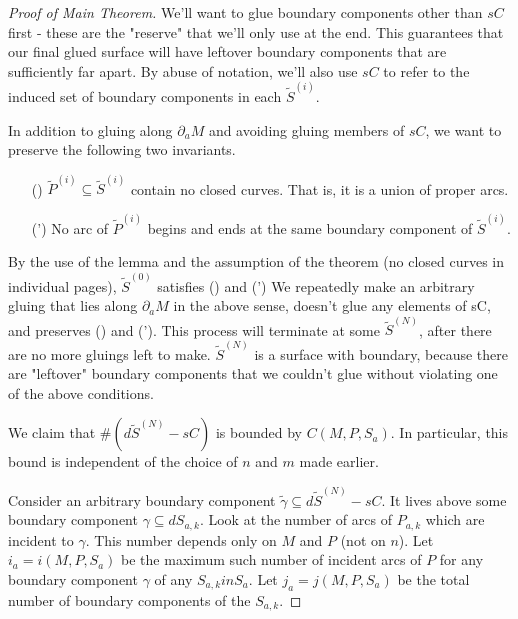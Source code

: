 \documentclass[12pt]{amsart}
\theoremstyle{definition}
\theoremstyle{remark}
\newcommand{\bd}{\partial}
\newcommand{\cin}{\subseteq}
\begin{document}
\begin{proof}[Proof of Main Theorem]
We'll want to glue boundary components other than $sC$ first - these are the
"reserve" that we'll only use at the end. This guarantees that our final glued
surface will have leftover boundary components that are sufficiently far apart.
By abuse of notation, we'll also use $sC$ to refer to the induced set of
boundary components in each $\widetilde{S}^{(i)}$.

In addition to gluing along $\bd_aM$ and avoiding gluing members of $sC$, we want
to preserve the following two invariants.


\begin{enumerate}

\item[(\dag)] $\widetilde{P}^{(i)} \cin \widetilde{S}^{(i)}$ contain no closed
curves.  That is, it is a union of proper arcs. \label{I:dag}

\item[(\dag')] No arc of $\widetilde{P}^{(i)}$ begins and ends at the same
boundary component of $\widetilde{S}^{(i)}$. \label{I:dag'}

\end{enumerate}

By the use of the lemma and the assumption of the theorem (no closed curves in
individual pages), $\widetilde{S}^{(0)}$ satisfies (\dag) and (\dag') We
repeatedly make an arbitrary gluing that lies along $\bd_aM$ in the above
sense, doesn't glue any elements of sC, and preserves (\dag) and (\dag').  This
process will terminate at some $\widetilde{S}^{(N)}$, after there are no more
gluings left to make. $\widetilde{S}^{(N)}$ is a surface with boundary, because
there are "leftover" boundary components that we couldn't glue without
violating one of the above conditions.


We claim that $\#(d\widetilde{S}^{(N)} - sC)$ is bounded by $C(M,P,S_a)$.  In
particular, this bound is independent of the choice of $n$ and $m$ made
earlier.


Consider an arbitrary boundary component $\widetilde{\gamma} \cin
d\widetilde{S}^{(N)} - sC$.  It lives above some boundary component $\gamma
\cin dS_{a,k}$. Look at the number of arcs of $P_{a,k}$ which are incident to
$\gamma$. This number depends only on $M$ and $P$ (not on $n$). Let $i_a
= i(M,P,S_a)$ be the maximum such number of incident arcs of $P$ for any
boundary component $\gamma$ of any $S_{a,k} in S_a$. Let $j_a = j(M,P,S_a)$ be
the total number of boundary components of the $S_{a,k}$.


\end{proof}
\end{document}
